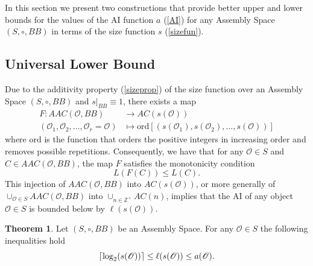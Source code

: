 \documentclass[letterpaper,12pt]{article}
\DeclarePairedDelimiter\ceil{\lceil}{\rceil}
\theoremstyle{definition}
\newtheorem{theorem}{Theorem}
\begin{document}
In this section we present two constructions that provide better upper and lower bounds for the values of the AI function $a$ (\ref{AI}) for any Assembly Space $(S,\circ,BB)$ in terms of the size function $s$ (\ref{sizefun}).

\subsection{Universal Lower Bound}
Due to the additivity property (\ref{sizeprop}) of the size function over an Assembly Space $(S,\circ,BB)$ and $s|_{BB}\equiv 1$, there exists a map 
\begin{equation}\label{mapF}
\begin{split}
    F: AAC(\mathscr{O},BB) & \to AC(s(\mathscr{O})) \\(\mathscr{O}_1,\mathscr{O}_2,\dots,\mathscr{O}_r=\mathscr{O}) & \mapsto \text{ord}[(s(\mathscr{O}_1),s(\mathscr{O}_2),\dots,s(\mathscr{O}))]
\end{split}
\end{equation}
where $\text{ord}$ is the function that orders the positive integers in increasing order and removes possible repetitions. Consequently, we have that for any $\mathscr{O} \in S$ and $C \in AAC(\mathscr{O},BB)$, the map $F$ satisfies the monotonicity condition 
\begin{equation}
    L(F(C)) \leq L(C).
\end{equation}
This injection of $AAC(\mathscr{O},BB)$ into $AC(s(\mathscr{O}))$, or more generally of $\cup_{\mathscr{O}\in S}AAC(\mathscr{O},BB)$ into $\cup_{n \in \mathbb{Z}^+}AC(n)$, implies that the AI of any object $\mathscr{O} \in S$ is bounded below by $\ell(s(\mathscr{O}))$. 

\begin{theorem}\label{Theo1} Let $(S,\circ,BB)$ be an Assembly Space. For any $\mathscr{O} \in S$ the following inequalities hold
    \begin{equation}\label{ineqbadai}
        \ceil*{\log_2 (s(\mathscr{O}))} \leq \ell(s(\mathscr{O})) \leq a(\mathscr{O}).
    \end{equation}
\end{theorem}
\end{document}
